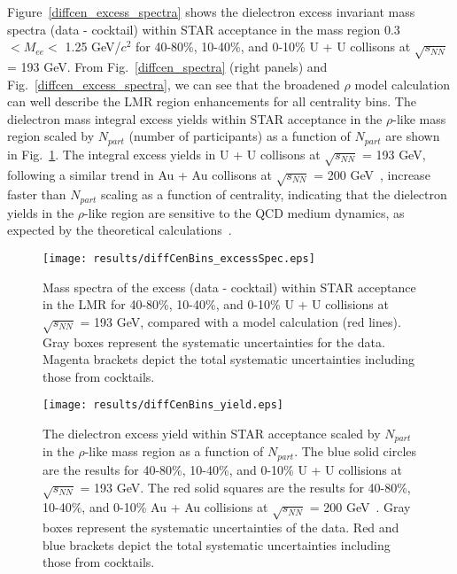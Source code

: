Figure~\ref{diffcen_excess_spectra} shows the dielectron excess invariant mass spectra (data - cocktail) within STAR acceptance in the mass region 0.3 $< M_{ee} <$ 1.25 GeV/$c^{2}$ for 40-80\%, 10-40\%, and 0-10\% U + U collisons at $\sqrt{s_{NN}}$ = 193 GeV. From Fig.~\ref{diffcen_spectra} (right panels) and Fig.~\ref{diffcen_excess_spectra}, we can see that the broadened $\rho$ model calculation can well describe the LMR region enhancements for all centrality bins. The dielectron mass integral excess yields within STAR acceptance in the $\rho$-like mass region scaled by $N_{part}$ (number of participants) as a function of $N_{part}$ are shown in Fig.~\ref{diffcen_excess_yield}. The integral excess yields in U + U collisons at $\sqrt{s_{NN}}$ = 193 GeV, following a similar trend in Au + Au collisons at $\sqrt{s_{NN}}$ = 200 GeV~\cite{STAR:dielectron1}, increase faster than $N_{part}$ scaling as a function of centrality, indicating that the dielectron yields in the $\rho$-like region are sensitive to the QCD medium dynamics, as expected by the theoretical calculations~\cite{rhopeak,broaden4}.
 
\begin{figure}[htbp]
\begin{minipage}[htbp]{0.50\linewidth}
\centering
\texttt{[image: results/diffCenBins\_excessSpec.eps]}
\caption{Mass spectra of the excess (data - cocktail) within STAR acceptance in the LMR for 40-80\%, 10-40\%, and 0-10\% U + U collisions at $\sqrt{s_{NN}}$ = 193 GeV, compared with a model calculation (red lines). Gray boxes represent the systematic uncertainties for the data. Magenta brackets depict the total systematic uncertainties including those from cocktails. \label{diffcen_excess_spectra}}
\end{minipage}
\hfill
\begin{minipage}[htbp]{0.48\linewidth}
\centering
\texttt{[image: results/diffCenBins\_yield.eps]} 
\caption{The dielectron excess yield within STAR acceptance scaled by $N_{part}$ in the $\rho$-like mass region as a function of  $N_{part}$. The blue solid circles are the results for 40-80\%, 10-40\%, and 0-10\% U + U collisions at $\sqrt{s_{NN}}$ = 193 GeV. The red solid squares are the results for 40-80\%, 10-40\%, and 0-10\% Au + Au collisions at $\sqrt{s_{NN}}$ = 200 GeV~\cite{STAR:dielectron1}. Gray boxes represent the systematic uncertainties of the data. Red and blue brackets depict the total systematic uncertainties including those from cocktails.\label{diffcen_excess_yield}}
\end{minipage}
\end{figure}

